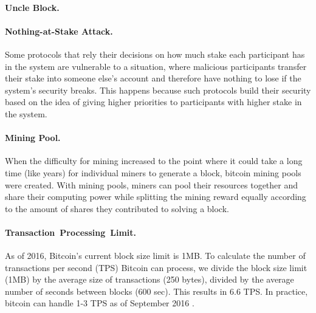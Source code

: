 \documentclass[11pt]{article}
\theoremstyle{mytheoremstyle}
\begin{document}
\paragraph{Uncle Block.} 

\paragraph{Nothing-at-Stake Attack.} Some protocols that rely their decisions on how much stake each participant has in the system are vulnerable to a situation, where malicious participants transfer their stake into someone else's account and therefore have nothing to lose if the system's security breaks. This happens because such protocols build their security based on the idea of giving higher priorities to participants with higher stake in the system.

\paragraph{Mining Pool.} When the difficulty for mining increased to the
point where it could take a long time (like years) for individual
miners to generate a block, bitcoin mining pools were created. With
mining pools, miners can pool their resources together and share their
computing power while splitting the mining reward equally according
to the amount of shares they contributed to solving a block.

\paragraph{Transaction~Processing~Limit.} As of 2016, Bitcoin's current
block size limit is 1MB. To calculate the number of transactions per
second (TPS) Bitcoin can process, we divide the block size limit (1MB)
by the average size of transactions (250 bytes), divided by the average
number of seconds between blocks (600 sec). This results in 6.6 TPS.
In practice, bitcoin can handle 1-3 TPS as of September 2016 \cite{Blockchain:TransPerBlock}.
\end{document}
